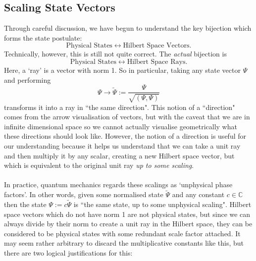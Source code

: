 \subsection{Scaling State Vectors}
Through careful discussion, we have begun to understand the key bijection which forms the state postulate:
$$
\text{Physical States} \leftrightarrow \text{Hilbert Space Vectors}.
$$
Technically, however, this is still not quite correct. The \textit{actual} bijection is 
$$
\text{Physical States} \leftrightarrow \text{Hilbert Space Rays}.
$$
Here, a `ray' is a vector with norm 1. So in particular, taking any state vector $\Psi$ and performing 
$$
\Psi \to \tilde{\Psi}:=\frac{\Psi}{\sqrt{(\Psi,\Psi)}}
$$
transforms it into a ray in ``the same direction". This notion of a ``direction" comes from the arrow visualisation of vectors, but with the caveat that we are in infinite dimensional space so we cannot actually visualise geometrically what these directions should look like. However, the notion of a direction is useful for our understanding because it helps us understand that we can take a unit ray and then multiply it by any scalar, creating a new Hilbert space vector, but which is equivalent to the original unit ray \textit{up to some scaling}.
\\\\
In practice, quantum mechanics regards these scalings as `unphysical phase factors'. In other words, given some normalised state $\tilde{\Psi}$ and any constant $c\in\mathbb{C}$ then the state $\Psi:=c\tilde{\Psi}$ is ``the same state, up to some unphysical scaling". Hilbert space vectors which do not have norm 1 are not physical states, but since we can always divide by their norm to create a unit ray in the Hilbert space, they can be considered to be physical states with some redundant scale factor attached. It may seem rather arbitrary to discard the multiplicative constants like this, but there are two logical justifications for this:
